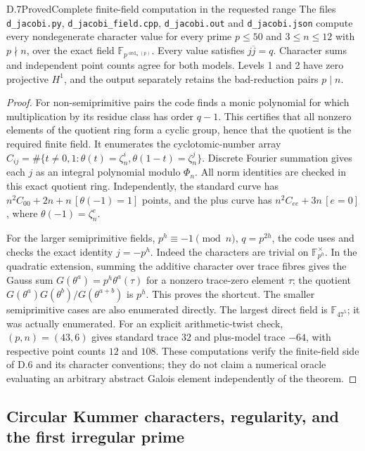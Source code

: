 \begin{statement}{D.7}{Proved}{Complete finite-field computation in the requested range}
The files \texttt{d\_jacobi.py}, \texttt{d\_jacobi\_field.cpp}, \texttt{d\_jacobi.out} and \texttt{d\_jacobi.json} compute every nondegenerate character value for every prime $p\leq50$ and $3\leq n\leq12$ with $p\nmid n$, over the exact field $\mathbb F_{p^{\operatorname{ord}_n(p)}}$. Every value satisfies $j\overline j=q$. Character sums and independent point counts agree for both models. Levels 1 and 2 have zero projective $H^1$, and the output separately retains the bad-reduction pairs $p\mid n$.
\end{statement}
\begin{proof}
For non-semiprimitive pairs the code finds a monic polynomial for which multiplication by its residue class has order $q-1$. This certifies that all nonzero elements of the quotient ring form a cyclic group, hence that the quotient is the required finite field. It enumerates the cyclotomic-number array
$C_{ij}=\#\{t\ne0,1:\theta(t)=\zeta_n^i,\theta(1-t)=\zeta_n^j\}$.
Discrete Fourier summation gives each $j$ as an integral polynomial modulo $\Phi_n$. All norm identities are checked in this exact quotient ring. Independently, the standard curve has
$n^2C_{00}+2n+n\,[\theta(-1)=1]$ points, and the plus curve has
$n^2C_{ee}+3n\,[e=0]$, where $\theta(-1)=\zeta_n^e$.

For the larger semiprimitive fields, $p^h\equiv-1\pmod n$, $q=p^{2h}$, the code uses and checks the exact identity $j=-p^h$. Indeed the characters are trivial on $\mathbb F_{p^h}^\times$. In the quadratic extension, summing the additive character over trace fibres gives the Gauss sum $G(\theta^a)=p^h\theta^a(\tau)$ for a nonzero trace-zero element $\tau$; the quotient $G(\theta^a)G(\theta^b)/G(\theta^{a+b})$ is $p^h$. This proves the shortcut. The smaller semiprimitive cases are also enumerated directly. The largest direct field is $\mathbb F_{47^5}$; it was actually enumerated. For an explicit arithmetic-twist check, $(p,n)=(43,6)$ gives standard trace $32$ and plus-model trace $-64$, with respective point counts $12$ and $108$. These computations verify the finite-field side of D.6 and its character conventions; they do not claim a numerical oracle evaluating an arbitrary abstract Galois element independently of the theorem.
\end{proof}

\subsection{Circular Kummer characters, regularity, and the first irregular prime}

